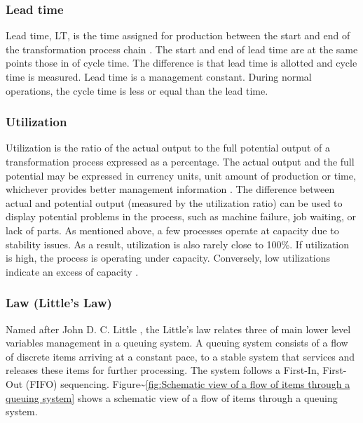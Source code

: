 \documentclass{article}
\begin{document}
\subsubsection{Lead time \label{lead_time}}
\label{sec:orge7af7e4}

Lead time, LT, is the time assigned for production between the start and end of the transformation process chain \citep{Hopp2001}.
The start and end of lead time are at the same points those in of cycle time.
The difference is that lead time is allotted and cycle time is measured.
Lead time is a management constant.
During normal operations, the cycle time is less or equal than the lead time.

\subsubsection{Utilization \label{utilization}}
\label{sec:orgd953969}

Utilization is the ratio of the actual output to the full potential output of a transformation process expressed as a percentage.
The actual output and the full potential may be expressed in currency units, unit amount of production or time, whichever provides better management information \citep{Kumar2009}.
The difference between actual and potential output (measured by the utilization ratio) can be used to display potential problems in the process, such as machine failure, job waiting, or lack of parts.
As mentioned above, a few processes operate at capacity due to stability issues.
As a result, utilization is also rarely close to 100\%.
If utilization is high, the process is operating under capacity.
Conversely, low utilizations indicate an excess of capacity \citep{Hopp2001}.

\subsubsection{Law (Little's Law) \label{littles_law}}
\label{sec:orgbbba45f}

Named after John D. C. Little \citep{Little1961}, the Little's law relates three of main lower level variables management in a queuing system.
A queuing system consists of a flow of discrete items arriving at a constant pace, to a stable system that services and releases these items for further processing.
The system follows a First-In, First-Out (FIFO) sequencing.
Figure\textasciitilde{}\ref{fig:Schematic view of a flow of items through a queuing system} shows a schematic view of a flow of items through a queuing system.
\end{document}
